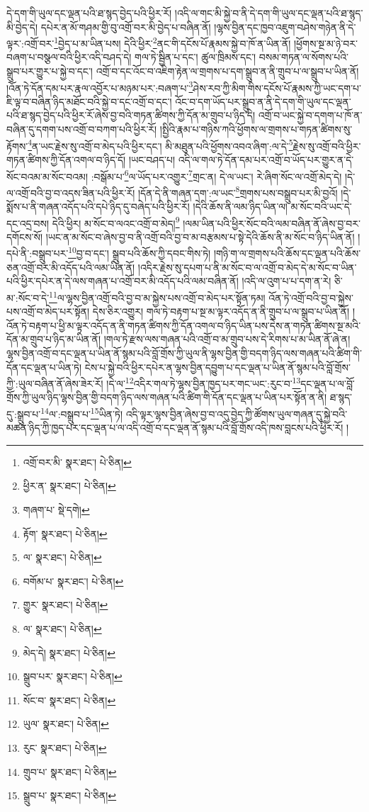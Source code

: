 དེ་དག་གི་ཡུལ་དང་ལྡན་པའི་ཐ་སྙད་བྱེད་པའི་ཕྱིར་རོ། །འདི་ལ་གང་མི་སྐྱེ་བ་ནི་དེ་དག་གི་ཡུལ་དང་ལྡན་པའི་ཐ་སྙད་མི་བྱེད་དེ། དཔེར་ན་མོ་གཤམ་གྱི་བུ་འགྲོ་བར་མི་བྱེད་པ་བཞིན་ནོ། །ལྷས་བྱིན་དང་ཁྱབ་འཇུག་བཤེས་གཉེན་ནི་དེ་ལྟར་:འགྲོ་བར་\footnote{འགྲོ་བར་མི་  སྣར་ཐང་།  པེ་ཅིན། }བྱེད་པ་མ་ཡིན་པས། དེའི་ཕྱིར་\footnote{ཕྱིར་ན་  སྣར་ཐང་།  པེ་ཅིན། }ནང་གི་དངོས་པོ་རྣམས་སྐྱེ་བ་ཁོ་ན་ཡིན་ནོ། །ཕྱོགས་སྔ་མ་ཉེ་བར་བཞག་པ་བསྩལ་བའི་ཕྱིར་འདི་བཤད་དེ། གལ་ཏེ་སྦྱིན་པ་དང་། ཚུལ་ཁྲིམས་དང་། བསམ་གཏན་ལ་སོགས་པའི་སྒྲུབ་པར་གྱུར་པ་སྐྱེ་བ་དང་། འགྲོ་བ་དང་འོང་བ་འཇིག་རྟེན་ལ་གྲགས་པ་དག་སྒྲུབ་ན་ནི་གྲུབ་པ་ལ་སྒྲུབ་པ་ཡིན་ནོ། །འོན་ཏེ་དོན་དམ་པར་རྣལ་འབྱོར་པ་མཉམ་པར་:བཞག་པ་\footnote{གཞག་པ་  སྡེ་དགེ། }ཤེས་རབ་ཀྱི་མིག་གིས་དངོས་པོ་རྣམས་ཀྱི་ཡང་དག་པ་ཇི་ལྟ་བ་བཞིན་ཉིད་མཐོང་བའི་སྐྱེ་བ་དང་འགྲོ་བ་དང་། འོང་བ་དག་ཡོད་པར་སྒྲུབ་ན་ནི་དེ་དག་གི་ཡུལ་དང་ལྡན་པའི་ཐ་སྙད་བྱེད་པའི་ཕྱིར་རོ་ཞེས་བྱ་བའི་གཏན་ཚིགས་ཀྱི་དོན་མ་གྲུབ་པ་ཉིད་དེ། འགྲོ་བ་ཡང་སྐྱེ་བ་དགག་པ་ཁོ་ན་བཞིན་དུ་དགག་པས་འགྲོ་བ་བཀག་པའི་ཕྱིར་རོ། །སྤྱིའི་རྣམ་པ་གཉིས་ཀའི་ཕྱོགས་ལ་གྲགས་པ་གཏན་ཚིགས་སུ་རྟོགས་\footnote{རྟོག་  སྣར་ཐང་།  པེ་ཅིན། }ན་ཡང་རྗེས་སུ་འགྲོ་བ་མེད་པའི་ཕྱིར་དང་། མི་མཐུན་པའི་ཕྱོགས་འབའ་ཞིག་:ལ་དེ་\footnote{ལ་  སྣར་ཐང་།  པེ་ཅིན། }རྗེས་སུ་འགྲོ་བའི་ཕྱིར་གཏན་ཚིགས་ཀྱི་དོན་འགལ་བ་ཉིད་དོ། །ཡང་བཤད་པ། འདི་ལ་གལ་ཏེ་དོན་དམ་པར་འགྲོ་བ་ཡོད་པར་གྱུར་ན་དེ་སོང་བའམ་མ་སོང་བའམ། :བསྒོམ་པ་\footnote{བགོམ་པ་  སྣར་ཐང་།  པེ་ཅིན། }ལ་ཡོད་པར་འགྱུར་\footnote{གྱུར་  སྣར་ཐང་།  པེ་ཅིན། }གྲང་ན། དེ་ལ་ཡང་། རེ་ཞིག་སོང་ལ་འགྲོ་མེད་དེ། །དེ་ལ་འགྲོ་བའི་བྱ་བ་འདས་ཟིན་པའི་ཕྱིར་རོ། །དོན་དེ་ནི་གཞན་དག་:ལ་ཡང་\footnote{ལ་  སྣར་ཐང་།  པེ་ཅིན། }གྲགས་པས་བསྒྲུབ་པར་མི་བྱའོ། །དེ་སྨོས་པ་ནི་གཞན་འདོད་པའི་དཔེ་ཉིད་དུ་བཞེད་པའི་ཕྱིར་རོ། །དེའི་ཆོས་ནི་ལམ་ཉིད་ཡིན་ལ། མ་སོང་བའི་ཡང་དེ་དང་འདྲ་བས། དེའི་ཕྱིར། མ་སོང་བ་ལའང་འགྲོ་བ་མེད།\footnote{མེད་དེ།  སྣར་ཐང་།  པེ་ཅིན། } །ལམ་ཡིན་པའི་ཕྱིར་སོང་བའི་ལམ་བཞིན་ནོ་ཞེས་བྱ་བར་དགོངས་སོ། །ཡང་ན་མ་སོང་བ་ཞེས་བྱ་བ་ནི་འགྲོ་བའི་བྱ་བ་མ་བརྩམས་པ་སྟེ་དེའི་ཆོས་ནི་མ་སོང་བ་ཉིད་ཡིན་ནོ། །དཔེ་ནི་:བསྒྲུབ་པར་\footnote{སྒྲུབ་པར་  སྣར་ཐང་།  པེ་ཅིན། }བྱ་བ་དང་། སྒྲུབ་པའི་ཆོས་ཀྱི་དབང་གིས་ཏེ། །གཉི་ག་ལ་གྲགས་པའི་ཆོས་དང་ལྡན་པའི་ཆོས་ཅན་འགྲོ་བར་མི་འདོད་པའི་ལམ་ཡིན་ནོ། །འདིར་རྗེས་སུ་དཔག་པ་ནི་མ་སོང་བ་ལ་འགྲོ་བ་མེད་དེ་མ་སོང་བ་ཡིན་པའི་ཕྱིར་དཔེར་ན་དེ་ལས་གཞན་པ་འགྲོ་བར་མི་འདོད་པའི་ལམ་བཞིན་ནོ། །འདི་ལ་འུག་པ་པ་དག་ན་རེ། ཅི་མ་:སོང་བ་དེ་\footnote{སོང་བ་  སྣར་ཐང་།  པེ་ཅིན། }ལ་ལྷས་བྱིན་འགྲོ་བའི་བྱ་བ་མ་སྐྱེས་པས་འགྲོ་བ་མེད་པར་སྟོན་ཏམ། འོན་ཏེ་འགྲོ་བའི་བྱ་བ་སྐྱེས་པས་འགྲོ་བ་མེད་པར་སྟོན། དེས་ཅིར་འགྱུར། གལ་ཏེ་བརྟག་པ་སྔ་མ་ལྟར་འདོད་ན་ནི་གྲུབ་པ་ལ་སྒྲུབ་པ་ཡིན་ནོ། །འོན་ཏེ་བརྟག་པ་ཕྱི་མ་ལྟར་འདོད་ན་ནི་གཏན་ཚིགས་ཀྱི་དོན་འགལ་བ་ཉིད་ཡིན་པས་དེས་ན་གཏན་ཚིགས་སྔ་མའི་དོན་མ་གྲུབ་པ་ཉིད་མ་ཡིན་ནོ། །གལ་ཏེ་རྫས་ལས་གཞན་པའི་འགྲོ་བ་མ་གྲུབ་པས་དེ་རིགས་པ་མ་ཡིན་ནོ་ཞེ་ན། ལྷས་བྱིན་འགྲོ་བ་དང་ལྡན་པ་ཡིན་ནོ་སྙམ་པའི་བློ་གྲོས་ཀྱི་ཡུལ་ནི་ལྷས་བྱིན་གྱི་བདག་ཉིད་ལས་གཞན་པའི་ཚིག་གི་དོན་དང་ལྡན་པ་ཡིན་ཏེ། ངེས་པ་སྐྱེ་བའི་ཕྱིར་དཔེར་ན་ལྷས་བྱིན་དབྱུག་པ་དང་ལྡན་པ་ཡིན་ནོ་སྙམ་པའི་བློ་གྲོས་ཀྱི་:ཡུལ་བཞིན་ནོ་ཞེས་ཟེར་རོ། །དེ་ལ་\footnote{ཡུལ་  སྣར་ཐང་།  པེ་ཅིན། }འདིར་གལ་ཏེ་ལྷས་བྱིན་ཁྱད་པར་གང་ཡང་:རུང་བ་\footnote{རུང་  སྣར་ཐང་།  པེ་ཅིན། }དང་ལྡན་པ་ལ་བློ་གྲོས་ཀྱི་ཡུལ་ཉིད་ལྷས་བྱིན་གྱི་བདག་ཉིད་ལས་གཞན་པའི་ཚིག་གི་དོན་དང་ལྡན་པ་ཡིན་པར་སྟོན་ན་ནི། ཐ་སྙད་དུ་:སྒྲུབ་པ་\footnote{གྲུབ་པ་  སྣར་ཐང་།  པེ་ཅིན། }ལ་:བསྒྲུབ་པ་\footnote{སྒྲུབ་པ་  སྣར་ཐང་།  པེ་ཅིན། }ཡིན་ཏེ། འདི་ལྟར་ལྷས་བྱིན་ཞེས་བྱ་བ་འདུ་བྱེད་ཀྱི་ཚོགས་ཡུལ་གཞན་དུ་སྐྱེ་བའི་མཚན་ཉིད་ཀྱི་ཁྱད་པར་དང་ལྡན་པ་ལ་འདི་འགྲོ་བ་དང་ལྡན་ནོ་སྙམ་པའི་བློ་གྲོས་འདི་ཁས་བླངས་པའི་ཕྱིར་རོ། །
